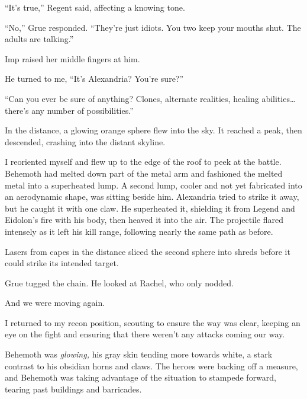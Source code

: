 ``It's true,'' Regent said, affecting a knowing tone.



``No,'' Grue responded.  ``They're just idiots.  You two keep your mouths shut.  The adults are talking.''



Imp raised her middle fingers at him.



He turned to me, ``It's Alexandria?  You're sure?''



``Can you ever be sure of anything?  Clones, alternate realities, healing abilities\ldots there's any number of possibilities.''



In the distance, a glowing orange sphere flew into the sky.  It reached a peak, then descended, crashing into the distant skyline.



I reoriented myself and flew up to the edge of the roof to peek at the battle.  Behemoth had melted down part of the metal arm and fashioned the melted metal into a superheated lump.  A second lump, cooler and not yet fabricated into an aerodynamic shape, was sitting beside him.  Alexandria tried to strike it away, but he caught it with one claw.  He superheated it, shielding it from Legend and Eidolon's fire with his body, then heaved it into the air.  The projectile flared intensely as it left his kill range, following nearly the same path as before.



Lasers from capes in the distance sliced the second sphere into shreds before it could strike its intended target.



Grue tugged the chain.  He looked at Rachel, who only nodded.



And we were moving again.



I returned to my recon position, scouting to ensure the way was clear, keeping an eye on the fight and ensuring that there weren't any attacks coming our way.



Behemoth was \emph{glowing, }his gray skin tending more towards white, a stark contrast to his obsidian horns and claws.  The heroes were backing off a measure, and Behemoth was taking advantage of the situation to stampede forward, tearing past buildings and barricades.



